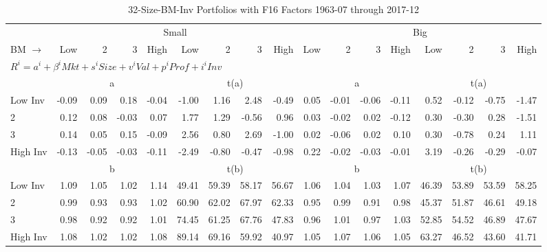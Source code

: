 
\begin{table}[!ht]
\footnotesize
\centering
\caption{32-Size-BM-Inv Portfolios with F16 Factors 1963-07 through 2017-12}
\begin{tabular}{lrrrrrrrrrrrrrrrr}
  \toprule
     & \multicolumn{8}{c}{Small} & \multicolumn{8}{c}{Big}  \\
     \cmidrule(r){2-9} \cmidrule(r){10-17}
    BM $\rightarrow$ & Low & 2 & 3 & High & Low & 2 & 3 & High & Low & 2 & 3 & High & Low & 2 & 3 & High  \\ 
  \midrule
  \multicolumn{17}{l}{$R^i=a^i+\beta^iMkt+s^iSize+v^iVal+p^iProf+i^iInv$}  \\
  
     & \multicolumn{4}{c}{a} & \multicolumn{4}{c}{t(a)}  & \multicolumn{4}{c}{a} & \multicolumn{4}{c}{t(a)}   \\
     \cmidrule(r){2-5} \cmidrule(r){6-9}  \cmidrule(r){10-13} \cmidrule(r){14-17} 
    Low Inv  & -0.09  & 0.09  & 0.18  & -0.04  & -1.00  & 1.16  & 2.48  & -0.49  & 0.05  & -0.01  & -0.06  & -0.11  & 0.52  & -0.12  & -0.75  & -1.47   \\
    2  & 0.12  & 0.08  & -0.03  & 0.07  & 1.77  & 1.29  & -0.56  & 0.96  & 0.03  & -0.02  & 0.02  & -0.12  & 0.30  & -0.30  & 0.28  & -1.51   \\
    3  & 0.14  & 0.05  & 0.15  & -0.09  & 2.56  & 0.80  & 2.69  & -1.00  & 0.02  & -0.06  & 0.02  & 0.10  & 0.30  & -0.78  & 0.24  & 1.11   \\
    High Inv  & -0.13  & -0.05  & -0.03  & -0.11  & -2.49  & -0.80  & -0.47  & -0.98  & 0.22  & -0.02  & -0.03  & -0.01  & 3.19  & -0.26  & -0.29  & -0.07   \\
    
  
     & \multicolumn{4}{c}{b} & \multicolumn{4}{c}{t(b)}  & \multicolumn{4}{c}{b} & \multicolumn{4}{c}{t(b)}   \\
     \cmidrule(r){2-5} \cmidrule(r){6-9}  \cmidrule(r){10-13} \cmidrule(r){14-17} 
    Low Inv  & 1.09  & 1.05  & 1.02  & 1.14  & 49.41  & 59.39  & 58.17  & 56.67  & 1.06  & 1.04  & 1.03  & 1.07  & 46.39  & 53.89  & 53.59  & 58.25   \\
    2  & 0.99  & 0.93  & 0.93  & 1.02  & 60.90  & 62.02  & 67.97  & 62.33  & 0.95  & 0.99  & 0.91  & 0.98  & 45.37  & 51.87  & 46.61  & 49.18   \\
    3  & 0.98  & 0.92  & 0.92  & 1.01  & 74.45  & 61.25  & 67.76  & 47.83  & 0.96  & 1.01  & 0.97  & 1.03  & 52.85  & 54.52  & 46.89  & 47.67   \\
    High Inv  & 1.08  & 1.02  & 1.02  & 1.08  & 89.14  & 69.16  & 59.92  & 40.97  & 1.05  & 1.07  & 1.06  & 1.05  & 63.27  & 46.52  & 43.60  & 41.71   \\
    

\end{tabular}
\end{table}
